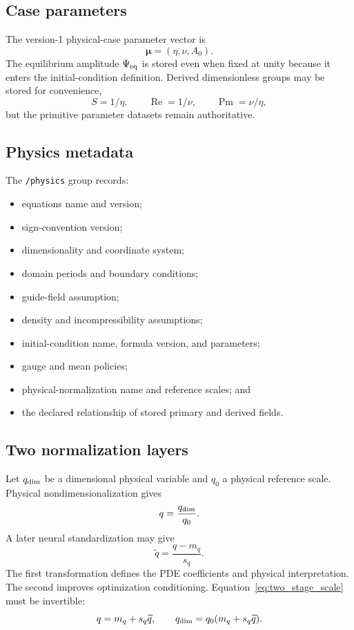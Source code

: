 \documentclass[11pt]{article}
\newcommand{\vect}[1]{\bm{#1}}
\newcommand{\dataset}[1]{\texttt{/#1}}
\begin{document}
\subsection{Case parameters}

The version-1 physical-case parameter vector is
\begin{equation}
\vect\mu=(\eta,\nu,A_0).
\end{equation}
The equilibrium amplitude $\Psi_{\rm eq}$ is stored even when fixed at unity because it enters the initial-condition definition. Derived dimensionless groups may be stored for convenience,
\begin{equation}
S=1/\eta,
\qquad
\operatorname{Re}=1/\nu,
\qquad
\operatorname{Pm}=\nu/\eta,
\end{equation}
but the primitive parameter datasets remain authoritative.

\subsection{Physics metadata}

The \dataset{physics} group records:
\begin{itemize}
  \item equations name and version;
  \item sign-convention version;
  \item dimensionality and coordinate system;
  \item domain periods and boundary conditions;
  \item guide-field assumption;
  \item density and incompressibility assumptions;
  \item initial-condition name, formula version, and parameters;
  \item gauge and mean policies;
  \item physical-normalization name and reference scales; and
  \item the declared relationship of stored primary and derived fields.
\end{itemize}

\subsection{Two normalization layers}

Let $q_{\rm dim}$ be a dimensional physical variable and $q_0$ a physical reference scale. Physical nondimensionalization gives
\begin{equation}
q=\frac{q_{\rm dim}}{q_0}.
\end{equation}
A later neural standardization may give
\begin{equation}
\widetilde q=\frac{q-m_q}{s_q}.
\label{eq:two_stage_scale}
\end{equation}
The first transformation defines the PDE coefficients and physical interpretation. The second improves optimization conditioning. Equation~\eqref{eq:two_stage_scale} must be invertible:
\begin{equation}
q=m_q+s_q\widetilde q,
\qquad
q_{\rm dim}=q_0(m_q+s_q\widetilde q).
\end{equation}
\end{document}

